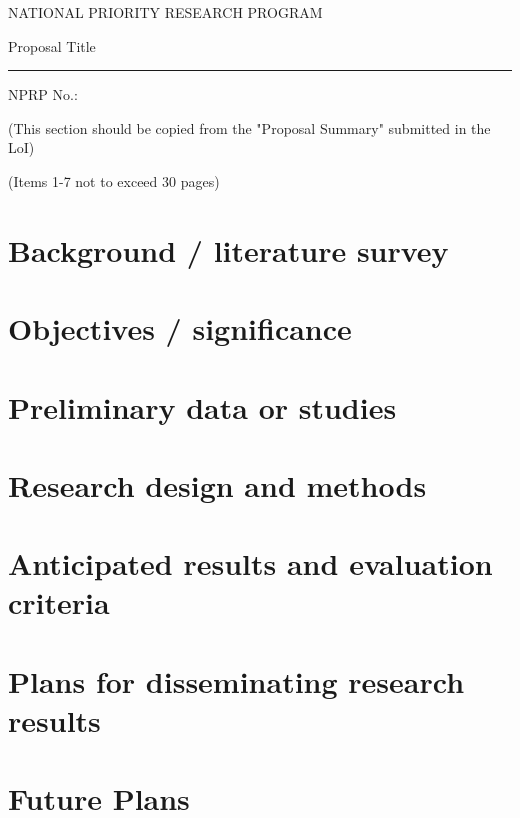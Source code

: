 \documentclass[11pt,letterpaper]{article}
\begin{document}
\begin{titlepage}
\begin{center}
\fontsize{11}{15}
\selectfont
NATIONAL PRIORITY RESEARCH PROGRAM

\vspace{4.5cm}

\fontsize{40}{48}
\selectfont
Proposal Title
\vspace{0.4cm}
{\color{blue2}\hrule}
\vspace{0.4cm}
\fontsize{22}{26}
\selectfont
NPRP No.:

\end{center}
\end{titlepage}

\rfoot{}
\renewcommand\contentsname{Table of Content}
\tableofcontents

\newpage
\setcounter{page}{1}

(This section should be copied from the "Proposal Summary" submitted in the LoI)

\bigskip
{}
(Items 1-7 not to exceed 30 pages)


\section{Background / literature survey}

\section{Objectives / significance}

\section{Preliminary data or studies}

\section{Research design and methods}

\section{Anticipated results and evaluation criteria}

\section{Plans for disseminating research results}

\section{Future Plans}


\newpage

\nocite{Nobody06}


\end{document}
